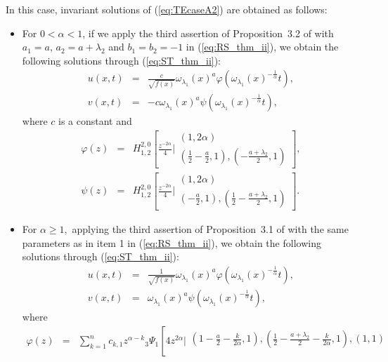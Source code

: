 \documentclass[12pt]{amsart}
\begin{document}
In this case, invariant solutions of (\ref{eq:TEcaseA2}) are obtained as follows:
\begin{itemize}
\item[1.] For $0 <\alpha<1$, if we apply the third assertion of Proposition~3.2 of
\cite{ourFCAA} 
with $a_1 = a$, $a_2 = a+\lambda_2$ and
$b_1 = b_2 =-1$ in (\ref{eq:RS_thm_ii}), we obtain the following solutions through (\ref{eq:ST_thm_ii}):
\begin{eqnarray}\label{sol1}
u(x,t)&=&\frac{c}{\sqrt{f(x)}}\omega_{\lambda_1}(x)^{a}
\varphi\left(\omega_{\lambda_1}(x)^{-\frac{1}{\alpha}} t\right),\nonumber\\
v(x,t)&=& -c\omega_{\lambda_1}(x)^a
\psi\left(\omega_{\lambda_1}(x)^{-\frac{1}{\alpha}} t\right),
\end{eqnarray}
where $c$ is a constant and
\begin{eqnarray*}
\varphi(z) & = &  H_{1,2}^{2,0}\left[\frac{z^{-2\alpha}}{4}\biggr\vert\begin{array}{c}
(1,2\alpha)\\
\left(\frac{1}{2}-\frac{a}{2},1\right), \left(-\frac{a+\lambda_2}{2},1\right)
\end{array}\right],\\
\psi(z) & = &  H_{1,2}^{2,0}\left[\frac{z^{-2\alpha}}{4}
\biggr\vert\begin{array}{c}
(1,2\alpha)\\
\left(-\frac{a}{2},1\right), \left(\frac{1}{2}-\frac{a+\lambda_2}{2},1\right)
\end{array}\right].
\end{eqnarray*}
\item[2.] For $\alpha\ge 1,$ applying the third assertion of Proposition~3.1 of \cite{ourFCAA} 
with the same parameters as in item 1 in (\ref{eq:RS_thm_ii}), we obtain the following solutions through (\ref{eq:ST_thm_ii}):
\begin{eqnarray}
u(x,t)&=&\frac{1}{\sqrt{f(x)}}\omega_{\lambda_1}(x)^{a}
\varphi\left(\omega_{\lambda_1}(x)^{-\frac{1}{\alpha}} t\right),\\
v(x,t)&=& \omega_{\lambda_1}(x)^a
\psi\left(\omega_{\lambda_1}(x)^{-\frac{1}{\alpha}} t\right),
\end{eqnarray}
where  
\begin{eqnarray*}
\varphi(z)&=&\sum_{k=1}^{n}c_{k,1}z^{\alpha-k} {}_3\Psi_1\left[4 z^{2\alpha}\biggr\vert
\begin{array}{c}
\left(1-\frac
{a}{2}-\frac{k}{2\alpha},1\right),\left(\frac{1}{2}-\frac{a+\lambda_2}{2}-\frac{k}{2\alpha},1\right),(1,1)\\

\end{array}
\end{eqnarray*}
\end{itemize}
\end{document}
